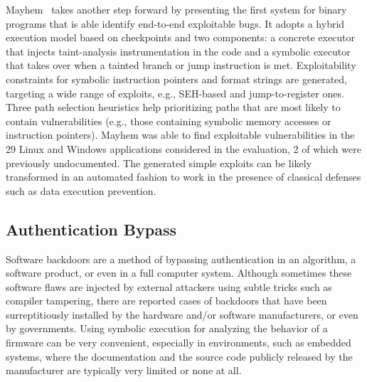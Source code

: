 {\sc Mayhem}~\cite{MAYHEM-SP12} takes another step forward by presenting the first system for binary programs that is able identify end-to-end exploitable bugs. It adopts a hybrid execution model based on checkpoints and two components: a concrete executor that injects taint-analysis instrumentation in the code and a symbolic executor that takes over when a tainted branch or jump instruction is met. Exploitability constraints for symbolic instruction pointers and format strings are generated, targeting a wide range of exploits, e.g., SEH-based and jump-to-register ones. Three path selection heuristics help prioritizing paths that are most likely to contain vulnerabilities (e.g., those containing symbolic memory accesses or instruction pointers). 
{\sc Mayhem} was able to find exploitable vulnerabilities in the 29 Linux and Windows applications considered in the evaluation, 2 of which were previously undocumented. The generated simple exploits can be likely transformed in an automated fashion to work in the presence of classical defenses such as data execution prevention. %

\subsection{Authentication Bypass}
\label{ss:auth-bypass}
Software backdoors are a method of bypassing authentication in an algorithm, a software product, or even in a full computer system. Although sometimes these software flaws are injected by external attackers using subtle tricks such as compiler tampering, there are reported cases of backdoors that have been surreptitiously installed by the hardware and/or software manufacturers, or even by governments. Using symbolic execution for analyzing the behavior of a firmware can be very convenient, especially in environments, such as embedded systems, where the documentation and the source code publicly released by the manufacturer are typically very limited or none at all.

